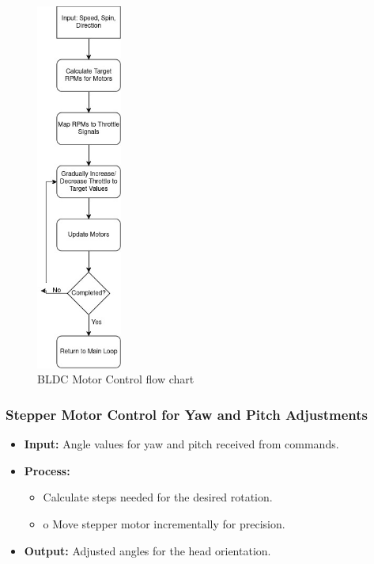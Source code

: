 \documentclass[12pt]{report}
\begin{document}
\begin{figure}[H]
    \centering
    \includegraphics[width=0.25\textwidth]{CH5 figureler/salih figureler/BLDC Motor Control flow chart.jpg}
    \caption{BLDC Motor Control flow chart}
    \label{fig:BLDC motor control flow chart}
\end{figure}

\subsubsection{Stepper Motor Control for Yaw and Pitch Adjustments}
\begin{itemize}
    \item \textbf{Input:} Angle values for yaw and pitch received from commands.
    \item  \textbf{Process:}
    \begin{itemize}
        \item Calculate steps needed for the desired rotation.
        \item o	Move stepper motor incrementally for precision.
    \end{itemize}
    \item \textbf{Output:} Adjusted angles for the head orientation.
\end{itemize}
\end{document}
